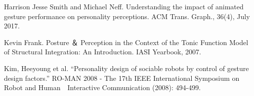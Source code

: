 \begin{thebibliography}{27}
Harrison Jesse Smith and Michael Neff. Understanding the impact of animated gesture performance on personality perceptions. ACM Trans. Graph., 36(4), July 2017.

Kevin Frank. Posture ＆ Perception in the Context of the Tonic Function Model of Structural Integration: An Introduction. IASI Yearbook, 2007.

Kim, Heeyoung et al. “Personality design of sociable robots by control of gesture design factors.” RO-MAN 2008 - The 17th IEEE International Symposium on Robot and Human　Interactive Communication (2008): 494-499.



















\end{thebibliography}